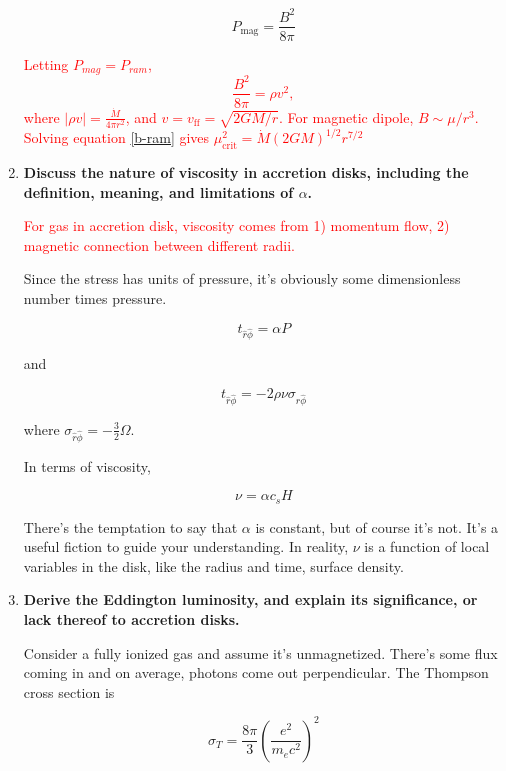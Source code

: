 \documentclass[a4paper]{article}
\begin{document}
\begin{enumerate}
\begin{equation}
P_\mathrm{mag} = \frac{B^2}{8 \pi}
\end{equation}

\textcolor{red}{Letting $P_{mag}=P_{ram}$, 
\begin{equation}
\frac{B^2}{8\pi}=\rho v^2,
\label{b-ram}
\end{equation}
where $|\rho v|=\frac{\dot M}{4\pi r^2}$, and $v=v_\mathrm{ff}=\sqrt{2GM/r}$. For magnetic dipole, $B\sim \mu/r^3$. Solving equation \ref{b-ram} gives $\mu_\mathrm{crit}^2=\dot M (2GM)^{1/2}r^{7/2}$
}
\item \textbf{Discuss the nature of viscosity in accretion disks, including the definition, meaning, and limitations of $\alpha$.}

\textcolor{red}{For gas in accretion disk, viscosity comes from 1) momentum flow, 2) magnetic connection between different radii.}

Since the stress has units of pressure, it's obviously some dimensionless number times pressure. 

\begin{equation}
t_{\hat{r}\hat{\phi}} = \alpha P
\end{equation}

and

\begin{equation}
t_{\hat{r}\hat{\phi}} = -2 \rho \nu \sigma_{\hat{r}\hat{\phi}}
\end{equation}

where $\sigma_{\hat{r}\hat{\phi}} = -\frac{3}{2} \Omega$. 

In terms of viscosity,

\begin{equation}
\nu = \alpha c_s H
\end{equation}

There's the temptation to say that $\alpha$ is constant, but of course it's not. It's a useful fiction to guide your understanding. In reality, $\nu$ is a function of local variables in the disk, like the radius and time, surface density. 

\item \textbf{Derive the Eddington luminosity, and explain its significance, or lack thereof to accretion
disks.}

Consider a fully ionized gas and assume it's unmagnetized. There's some flux coming in and on average, photons come out perpendicular. The Thompson cross section is

\begin{equation}
\sigma_T = \frac{8 \pi}{3} \left( \frac{e^2}{m_e c^2} \right)^2
\end{equation}


\end{enumerate}
\end{document}
